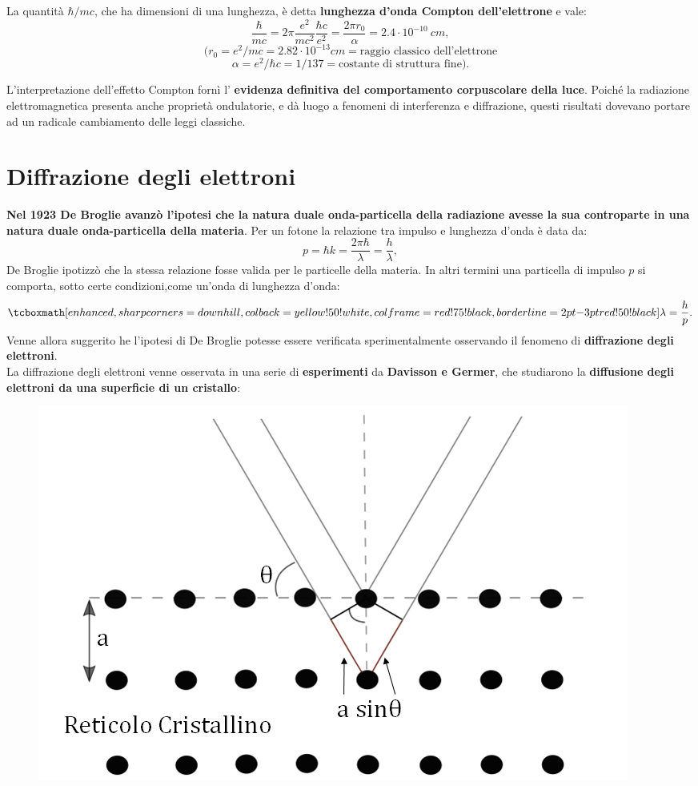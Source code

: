 \documentclass[a4paper,12pt,oneside]{book}
\begin{document}
La quantità $\hbar/ mc$, che ha dimensioni di una lunghezza, è detta \textbf{lunghezza d'onda Compton dell'elettrone} e vale:
\[
\frac{\hbar}{mc}= 2\pi \frac{e^2}{mc^2}\frac{\hbar c}{e^2}= \frac{2\pi r_0}{\alpha}= 2.4 \cdot 10^{-10} \ cm,
\]
\[(r_0 = e^2/mc = 2.82 \cdot 10^{-13} cm = \textrm{raggio classico dell'elettrone}\]
\[\alpha = e^2/\hbar c = 1/137 = \textrm{costante di struttura fine}).\]

L'interpretazione dell'effetto Compton fornì l' \textbf{evidenza definitiva del comportamento corpuscolare della luce}. Poiché la radiazione elettromagnetica presenta anche proprietà ondulatorie, e dà luogo a fenomeni di interferenza e diffrazione, questi risultati dovevano portare ad un radicale cambiamento delle leggi classiche.
\section{Diffrazione degli elettroni}
\textbf{Nel 1923 De Broglie avanzò l'ipotesi che la natura duale onda-particella della radiazione avesse la sua controparte in una natura duale onda-particella della materia}. Per un fotone la relazione tra impulso e lunghezza d'onda è data da:
\begin{equation}
p= \hbar k = \frac{2\pi \hbar}{\lambda}=\frac{h}{\lambda},
\end{equation}
De Broglie ipotizzò che la stessa relazione fosse valida per le particelle della materia. In altri termini una particella di impulso $p$ si comporta, sotto certe condizioni,come un'onda di lunghezza d'onda:
	\begin{equation}
		\tcboxmath[enhanced,sharp corners=downhill ,colback=yellow!50!white,colframe=red!75!black, borderline={2pt}{-3pt}{red!50!black}]{
			\lambda=\frac{h}{p}.
			}
	\end{equation}
Venne allora suggerito he l'ipotesi di De Broglie potesse essere verificata sperimentalmente osservando il fenomeno di \textbf{diffrazione degli elettroni}.\\
La diffrazione degli elettroni venne osservata in una serie di \textbf{esperimenti} da \textbf{Davisson e Germer}, che studiarono la \textbf{diffusione degli elettroni da una superficie di un cristallo}:
	\begin{figure}[!htbp]
		\begin{center}
			\includegraphics[width=.55\textwidth]{immagini/cap_1/fig_1_5.png}
		\end{center}
	\end{figure}
\end{document}
